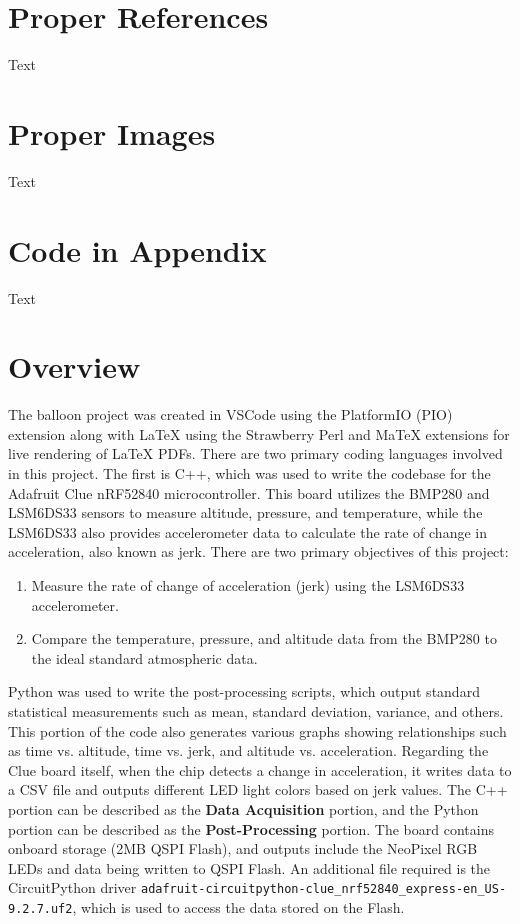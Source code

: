 \documentclass[12pt]{report}
\begin{document}
\chapter*{Proper References}
Text

\chapter*{Proper Images}
Text

\chapter*{Code in Appendix}
Text

\chapter*{Overview}
The balloon project was created in VSCode using the PlatformIO (PIO) extension along with LaTeX using the Strawberry Perl and MaTeX extensions for live rendering of LaTeX PDFs. There are two primary coding languages involved in this project. The first is C++, which was used to write the codebase for the Adafruit Clue nRF52840 microcontroller. This board utilizes the BMP280 and LSM6DS33 sensors to measure altitude, pressure, and temperature, while the LSM6DS33 also provides accelerometer data to calculate the rate of change in acceleration, also known as jerk. \newline
There are two primary objectives of this project:
\begin{enumerate}
    \item Measure the rate of change of acceleration (jerk) using the LSM6DS33 accelerometer.
    \item Compare the temperature, pressure, and altitude data from the BMP280 to the ideal standard atmospheric data.
\end{enumerate}
Python was used to write the post-processing scripts, which output standard statistical measurements such as mean, standard deviation, variance, and others. This portion of the code also generates various graphs showing relationships such as time vs. altitude, time vs. jerk, and altitude vs. acceleration. \newline
Regarding the Clue board itself, when the chip detects a change in acceleration, it writes data to a CSV file and outputs different LED light colors based on jerk values. The C++ portion can be described as the \textbf{Data Acquisition} portion, and the Python portion can be described as the \textbf{Post-Processing} portion. \newline
The board contains onboard storage (2MB QSPI Flash), and outputs include the NeoPixel RGB LEDs and data being written to QSPI Flash. An additional file required is the CircuitPython driver \texttt{adafruit-circuitpython-clue\_nrf52840\_express-en\_US-9.2.7.uf2}, which is used to access the data stored on the Flash.
\end{document}
